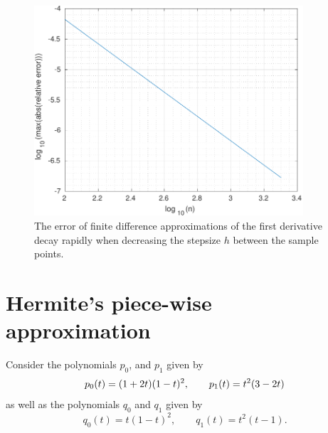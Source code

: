 \documentclass[a4paper,12pt]{article}
\newcommand{\be}{\begin{equation}}
\newcommand{\ee}{\end{equation}}
\begin{document}
 \begin{figure}
    \centering
    \includegraphics[width=10cm]{MyDerivs.pdf} \caption[The error of finite difference approximations of the derivative]{The error of finite difference approximations of the first derivative decay rapidly when decreasing the stepsize $h$ between the sample points.} \label{fig:MyDerivs}
    \end{figure}

 
 \section{Hermite's piece-wise approximation}
 Consider the polynomials $p_0$, and $p_1$ given by
 \be
 p_0(t) = (1 + 2t)(1-t)^2, \qquad  p_1(t) = t^2 (3-2t) \\
 \ee
 as well as the polynomials $q_0$ and $q_1$ given by
 \be
 q_0(t) = t(1-t)^2, \qquad q_1(t) = t^2 (t-1).
 \ee
   
\end{document}
